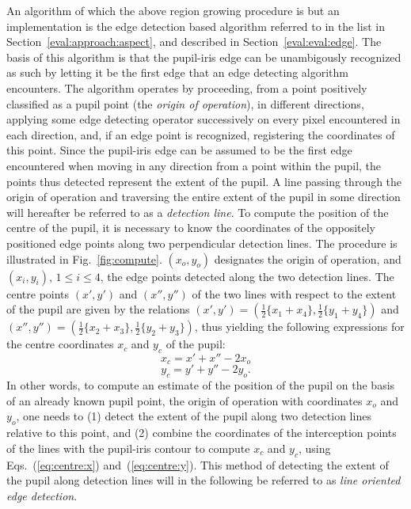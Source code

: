 An algorithm of which the above region growing procedure is but an
implementation is the edge detection based algorithm referred to in
the list in Section~\ref{eval:approach:aspect}, and described in
Section~\ref{eval:eval:edge}.  The basis of this algorithm is that the
pupil-iris edge can be unambigously recognized as such by letting it
be the first edge that an edge detecting algorithm encounters.  The
algorithm operates by proceeding, from a point positively classified
as a pupil point (the {\em origin of operation\/}), in different
directions, applying some edge detecting operator successively on
every pixel encountered in each direction, and, if an edge point is
recognized, registering the coordinates of this point.  Since the
pupil-iris edge can be assumed to be the first edge encountered when
moving in any direction from a point within the pupil, the points thus
detected represent the extent of the pupil.  A line passing through
the origin of operation and traversing the entire extent of the pupil
in some direction will hereafter be referred to as a {\em detection
  line\/}.  To compute the position of the centre of the pupil, it is
necessary to know the coordinates of the oppositely positioned edge
points along two perpendicular detection lines.  The procedure is
illustrated in Fig.~\ref{fig:compute}.  $(x_{o},y_{o})$ designates the
origin of operation, and $(x_{i},y_{i})$, $1\leq i\leq 4$, the edge
points detected along the two detection lines.  The centre points
$(x',y')$ and $(x'',y'')$ of the two lines with respect to the extent
of the pupil are given by the relations
$(x',y')=(\frac{1}{2}\{x_{1}+x_{4}\},\frac{1}{2}\{y_{1}+y_{4}\})$ and
$(x'',y'')=(\frac{1}{2}\{x_{2}+x_{3}\},\frac{1}{2}\{y_{2}+y_{3}\})$,
thus yielding the following expressions for the centre coordinates
$x_{c}$ and $y_{c}$ of the pupil:
\begin{equation}
\label{eq:centre:x}
  x_{c}=x'+x''-2x_{o}
\end{equation}
\begin{equation}
\label{eq:centre:y}
  y_{c}=y'+y''-2y_{o}\mbox{.}
\end{equation}
In other words, to compute an estimate of the position of the pupil on
the basis of an already known pupil point, the origin of operation
with coordinates $x_{o}$ and $y_{o}$, one needs to (1) detect the
extent of the pupil along two detection lines relative to this point,
and (2) combine the coordinates of the interception points of the
lines with the pupil-iris contour to compute $x_{c}$ and $y_{c}$,
using Eqs.~(\ref{eq:centre:x}) and~(\ref{eq:centre:y}).  This method
of detecting the extent of the pupil along detection lines will in the
following be referred to as {\em line oriented edge detection\/}.

